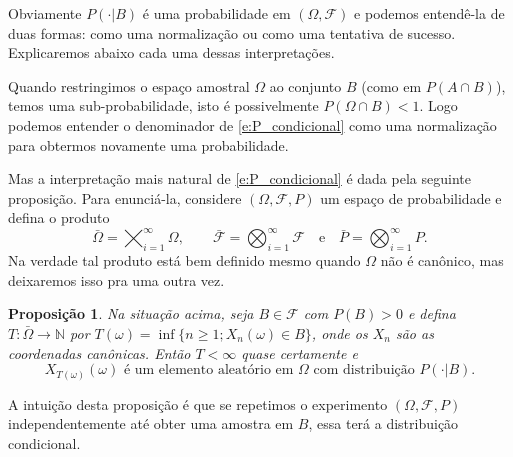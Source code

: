 \documentclass[reqno]{article}
\newcommand*\1{\mathds{1}}
\newtheorem{proposition}[theorem]{Proposição}
\begin{document}
Obviamente $P(\cdot | B)$ é uma probabilidade em $(\Omega, \mathcal{F})$ e podemos entendê-la de duas formas: como uma normalização ou como uma tentativa de sucesso.
Explicaremos abaixo cada uma dessas interpretações.

Quando restringimos o espaço amostral $\Omega$ ao conjunto $B$ (como em $P(A \cap B)$), temos uma sub-probabilidade, isto é possivelmente $P(\Omega \cap B) < 1$.
Logo podemos entender o denominador de \eqref{e:P_condicional} como uma normalização para obtermos novamente uma probabilidade.

Mas a interpretação mais natural de \eqref{e:P_condicional} é dada pela seguinte proposição.
Para enunciá-la, considere $(\Omega, \mathcal{F}, P)$ um espaço de probabilidade e defina o produto
\begin{equation}
  \bar{\Omega} = \bigtimes_{i=1}^\infty \Omega, \qquad \bar{\mathcal{F}} = \bigotimes_{i=1}^\infty \mathcal{F} \quad \text{e} \quad \bar P = \bigotimes_{i=1}^\infty P.
\end{equation}
Na verdade tal produto está bem definido mesmo quando $\Omega$ não é canônico, mas deixaremos isso pra uma outra vez.

\begin{proposition}
  Na situação acima, seja $B \in \mathcal{F}$ com $P(B) > 0$ e defina $T:\bar{\Omega} \to \mathbb{N}$ por $T(\omega) = \inf \{n \geq 1; X_n(\omega) \in B\}$, onde os $X_n$ são as coordenadas canônicas. Então $T < \infty$ quase certamente e
  \begin{equation}
    \text{$X_{T(\omega)}(\omega)$ é um elemento aleatório em $\Omega$ com distribuição $P(\cdot | B)$.}
  \end{equation}
\end{proposition}

A intuição desta proposição é que se repetimos o experimento $(\Omega, \mathcal{F}, P)$ independentemente até obter uma amostra em $B$, essa terá a distribuição condicional.
\end{document}
